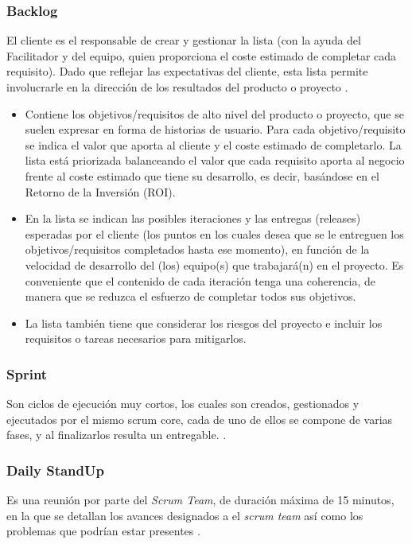 \documentclass[10pt]{article}
\begin{document}
\subsubsection{Backlog}
El cliente es el responsable de crear y gestionar la lista (con la ayuda del Facilitador y del equipo, quien proporciona el coste estimado de completar cada requisito). Dado que reflejar las expectativas del cliente, esta lista permite involucrarle en la dirección de los resultados del producto o proyecto \cite{IEEEreferencias:Ref23}.
\newpage
\begin{itemize}
    \item Contiene los objetivos/requisitos de alto nivel del producto o proyecto, que se suelen expresar en forma de historias de usuario. Para cada objetivo/requisito se indica el valor que aporta al cliente y el coste estimado de completarlo. La lista está priorizada balanceando el valor que cada requisito aporta al negocio frente al coste estimado que tiene su desarrollo, es decir, basándose en el Retorno de la Inversión (ROI).
    
    \item En la lista se indican las posibles iteraciones y las entregas (releases) esperadas por el cliente (los puntos en los cuales desea que se le entreguen los objetivos/requisitos completados hasta ese momento), en función de la velocidad de desarrollo del (los) equipo(s) que trabajará(n) en el proyecto. Es conveniente que el contenido de cada iteración tenga una coherencia, de manera que se reduzca el esfuerzo de completar todos sus objetivos.
    \item La lista también tiene que considerar los riesgos del proyecto e incluir los requisitos o tareas necesarios para mitigarlos\cite{IEEEreferencias:Ref23}.

\end{itemize}

\subsubsection{Sprint}
Son ciclos de ejecución muy cortos, los cuales son creados, gestionados y ejecutados por el mismo scrum core, cada de uno de ellos se compone de varias fases, y al finalizarlos resulta un entregable. \cite{IEEEreferencias:Ref21}.

\subsubsection{Daily StandUp}
Es una reunión por parte del \textit{Scrum Team}, de duración máxima de 15 minutos, en la que se detallan los avances designados a el \textit{scrum team} así como los problemas que podrían estar presentes \cite{IEEEreferencias:Ref21}.
\end{document}
